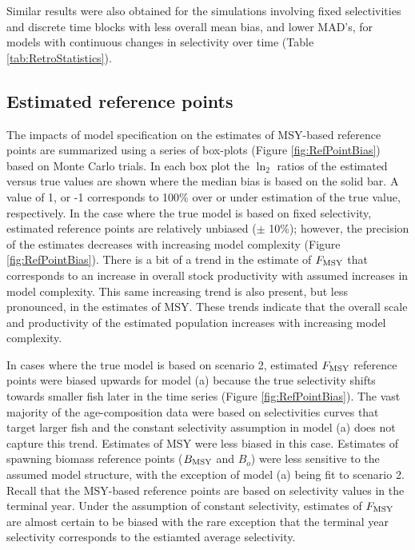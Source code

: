 Similar results were also obtained for the simulations involving fixed selectivities and discrete time blocks with less overall mean bias, and lower MAD's, for models with continuous changes in selectivity over time (Table \ref{tab:RetroStatistics}).




\subsection*{Estimated reference points} %
\label{sub:estimated_reference_points}


The impacts of model specification on the estimates of MSY-based reference points are summarized using a series of box-plots (Figure \ref{fig:RefPointBias}) based on Monte Carlo trials.  In each box plot the $\ln_2$ ratios of the estimated versus true values are shown where the median bias is based on the solid bar.  A value of 1, or -1 corresponds to 100\% over or under estimation of the true value, respectively.  In the case where the true model is based on fixed selectivity, estimated reference points are relatively unbiased ($\pm$ 10\%); however, the precision of the estimates decreases with increasing model complexity (Figure \ref{fig:RefPointBias}).  There is a bit of a trend in the estimate of $F_{\rm{MSY}}$ that corresponds to an increase in overall stock productivity with assumed increases in model complexity.  This same increasing trend is also present, but less pronounced, in the estimates of MSY.  These trends indicate that the overall scale and productivity of the estimated population increases with increasing model complexity. 

In cases where the true model is based on scenario 2, estimated $F_{\rm{MSY}}$ reference points were biased upwards for model (a)  because the true selectivity shifts towards smaller fish later in the time series (Figure \ref{fig:RefPointBias}). The vast majority of the age-composition data were based on selectivities curves that target larger fish and the constant selectivity assumption in model (a) does not capture this trend. Estimates of MSY were less biased in this case. Estimates of spawning biomass reference points ($B_{\rm{MSY}}$ and $B_o$) were less sensitive to the assumed model structure, with the exception of model (a) being fit to scenario 2. Recall that the MSY-based reference points are based on selectivity values in the terminal year. Under the assumption of constant selectivity, estimates of $F_{\rm{MSY}}$ are almost certain to be biased with the rare exception that the terminal year selectivity corresponds to the estiamted average selectivity.  

